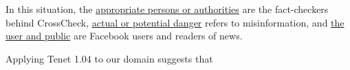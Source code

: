 \tenetmargin

In this situation, the \ul{appropriate persons or authorities} are the fact-checkers behind CrossCheck, \ul{actual or potential danger} refers to misinformation, and \ul{the user and public} are Facebook users and readers of news.


Applying Tenet 1.04 to our domain suggests that
